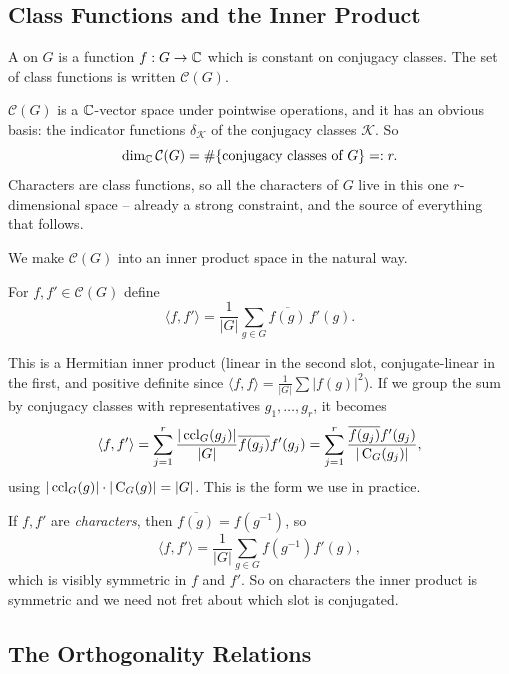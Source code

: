 \documentclass[a4paper]{scrartcl}
\newcommand{\Cent}{\operatorname{C}}
\newcommand{\ip}[2]{\langle #1, #2 \rangle}
\begin{document}
\subsection{Class Functions and the Inner Product}

\begin{definition}
	A  on $G$ is a function $f : G \to \mathbb{C}$ which is constant on conjugacy classes. The set of class functions is written $\mathcal{C}(G)$.
\end{definition}

$\mathcal{C}(G)$ is a $\mathbb{C}$-vector space under pointwise operations, and it has an obvious basis: the indicator functions $\delta_{\mathcal{K}}$ of the conjugacy classes $\mathcal{K}$. So
$$\dim_{\mathbb{C}} \mathcal{C}(G) = \#\{\text{conjugacy classes of } G\} =: r.$$
Characters are class functions, so all the characters of $G$ live in this one $r$-dimensional space -- already a strong constraint, and the source of everything that follows.

We make $\mathcal{C}(G)$ into an inner product space in the natural way.

\begin{definition}
	For $f, f' \in \mathcal{C}(G)$ define
	$$\ip{f}{f'} = \frac{1}{|G|}\sum_{g \in G} \overline{f(g)}\, f'(g).$$
\end{definition}

This is a Hermitian inner product (linear in the second slot, conjugate-linear in the first, and positive definite since $\ip ff = \frac1{|G|}\sum|f(g)|^2$). If we group the sum by conjugacy classes with representatives $g_1, \dots, g_r$, it becomes
$$\ip{f}{f'} = \sum_{j=1}^r \frac{|\ccl_G(g_j)|}{|G|}\overline{f(g_j)}f'(g_j) = \sum_{j=1}^r \frac{\overline{f(g_j)}f'(g_j)}{|\Cent_G(g_j)|},$$
using $|\ccl_G(g)| \cdot |\Cent_G(g)| = |G|$. This is the form we use in practice.

\begin{remark}
	If $f, f'$ are \emph{characters}, then $\overline{f(g)} = f(g^{-1})$, so
	$$\ip{f}{f'} = \frac{1}{|G|}\sum_{g\in G} f(g^{-1})f'(g),$$
	which is visibly symmetric in $f$ and $f'$. So on characters the inner product is symmetric and we need not fret about which slot is conjugated.
\end{remark}

\subsection{The Orthogonality Relations}
\end{document}
